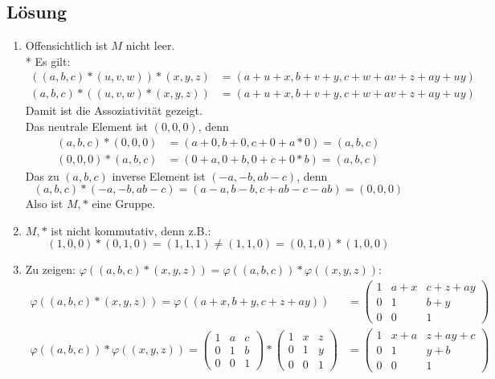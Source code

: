 \subsection{Lösung}
\begin{enumerate}
	\item Offensichtlich ist \( M \) nicht leer.
		\\*
		Es gilt:
		\begin{align*}
			((a,b,c) \ast (u,v,w)) \ast (x,y,z) &= (a+u+x, b+v+y, c+w+av+z+ay+uy) \\
			(a,b,c) \ast ((u,v,w) \ast (x,y,z)) &= (a+u+x, b+v+y, c+w+av+z+ay+uy)
		\end{align*}
		Damit ist die Assoziativität gezeigt.
		\\
		Das neutrale Element ist \( (0,0,0) \), denn
		\begin{align*}
			(a,b,c) \ast (0,0,0) &= (a + 0, b + 0, c + 0 + a*0) = (a,b,c) \\
			(0,0,0) \ast (a,b,c) &= (0 + a, 0 + b, 0 + c + 0*b) = (a,b,c)
		\end{align*}
		Das zu \( (a,b,c) \) inverse Element ist \( (-a, -b, ab-c) \), denn
		\begin{equation*}
			(a,b,c) \ast (-a, -b, ab-c) = (a - a, b - b, c + ab - c - ab) = (0,0,0)
		\end{equation*}
		Also ist \( M, \ast \) eine Gruppe.

	\item \( M, \ast \) ist nicht kommutativ, denn z.B.:
		\begin{equation*}
			(1,0,0) \ast (0,1,0) = (1,1,1) \neq (1,1,0) = (0,1,0) \ast (1,0,0)
		\end{equation*}
	\item Zu zeigen: \( \varphi((a,b,c) \ast (x,y,z)) = \varphi((a,b,c)) * \varphi((x,y,z)) \):
	\begin{align*}
		\varphi((a,b,c) \ast (x,y,z)) = \varphi((a+x, b+y, c+z+ay)) &= \begin{pmatrix}
			1 & a+x & c+z+ay \\
			0 & 1 & b+y \\
			0 & 0 & 1
		\end{pmatrix} \\
		\varphi((a,b,c)) * \varphi((x,y,z)) = \begin{pmatrix}
			1 & a & c \\
			0 & 1 & b \\
			0 & 0 & 1
		\end{pmatrix} * \begin{pmatrix}
			1 & x & z \\
			0 & 1 & y \\
			0 & 0 & 1
		\end{pmatrix} &= \begin{pmatrix}
			1 & x+a & z+ay+c \\
			0 & 1 & y+b \\
			0 & 0 & 1
		\end{pmatrix}
	\end{align*}
\end{enumerate}

